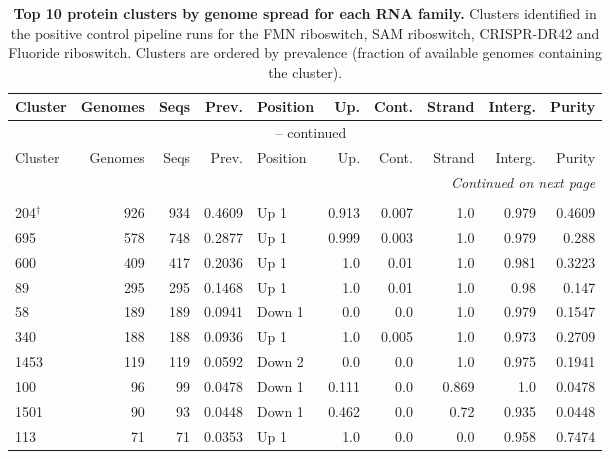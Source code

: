 \begingroup
\footnotesize
\setlength{\tabcolsep}{3pt}
\begin{longtable}{lrrrlrrrrr}
\caption[Positive control run clusters (full)]{\textbf{Top 10 protein clusters by genome spread for each RNA family.}
    Clusters identified in the positive control pipeline runs for the \ac{FMN} riboswitch, \ac{SAM} riboswitch, \ac{CRISPR}-DR42 and Fluoride riboswitch.
    Clusters are ordered by prevalence (fraction of available genomes containing the cluster).}
\label{tab:cluster_appendix} \\
\hline
Cluster & Genomes & Seqs & Prev. & Position & Up. & Cont. & Strand & Interg. & Purity \\
\hline
\endfirsthead

\multicolumn{10}{c}{\tablename\ \thetable{} -- continued} \\
\hline
Cluster & Genomes & Seqs & Prev. & Position & Up. & Cont. & Strand & Interg. & Purity \\
\hline
\endhead

\hline
\multicolumn{10}{r}{\emph{Continued on next page}} \\
\endfoot

\hline
\endlastfoot

\multicolumn{10}{l}{\textbf{FMN riboswitch (RF00050)}: 1599 clusters, 2009 genomes, 1115 singleton-genome clusters} \\
\hline
204$^\dagger$ & 926 & 934 & 0.4609 & Up 1 & 0.913 & 0.007 & 1.0 & 0.979 & 0.4609 \\
695 & 578 & 748 & 0.2877 & Up 1 & 0.999 & 0.003 & 1.0 & 0.979 & 0.288 \\
600 & 409 & 417 & 0.2036 & Up 1 & 1.0 & 0.01 & 1.0 & 0.981 & 0.3223 \\
89 & 295 & 295 & 0.1468 & Up 1 & 1.0 & 0.01 & 1.0 & 0.98 & 0.147 \\
58 & 189 & 189 & 0.0941 & Down 1 & 0.0 & 0.0 & 1.0 & 0.979 & 0.1547 \\
340 & 188 & 188 & 0.0936 & Up 1 & 1.0 & 0.005 & 1.0 & 0.973 & 0.2709 \\
1453 & 119 & 119 & 0.0592 & Down 2 & 0.0 & 0.0 & 1.0 & 0.975 & 0.1941 \\
100 & 96 & 99 & 0.0478 & Down 1 & 0.111 & 0.0 & 0.869 & 1.0 & 0.0478 \\
1501 & 90 & 93 & 0.0448 & Down 1 & 0.462 & 0.0 & 0.72 & 0.935 & 0.0448 \\
113 & 71 & 71 & 0.0353 & Up 1 & 1.0 & 0.0 & 0.0 & 0.958 & 0.7474 \\
\hline


\end{longtable}
